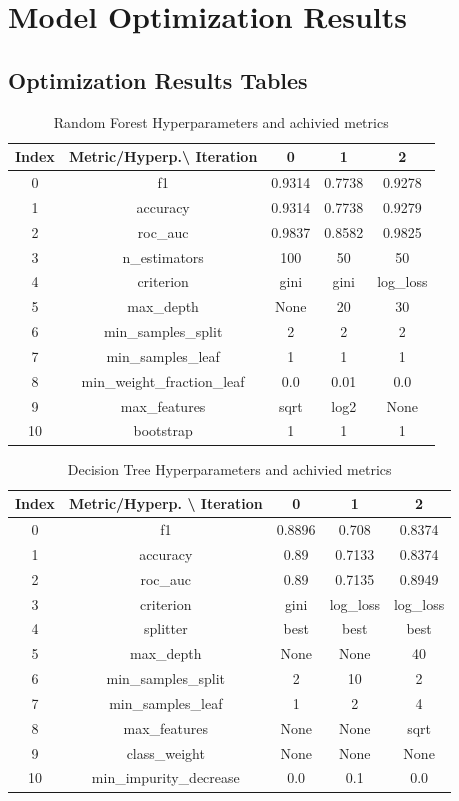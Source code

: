 \documentclass{article}%
\begin{document}
%
\newpage%
\section{Model Optimization Results}%
\label{sec:ModelOptimizationResults}%
\subsection{Optimization Results Tables}%
\label{subsec:OptimizationResultsTables}%


\begin{table}[h!]%
\caption{Random Forest Hyperparameters and achivied metrics}%
\vspace{0.2cm}%
\centering%
\begin{tabular}{|c||c||c||c||c|}%
\hline%
Index&Metric/Hyperp.\textbackslash{} Iteration&0&1&2\\%
\hline%
0&f1&0.9314&0.7738&0.9278\\%
1&accuracy&0.9314&0.7738&0.9279\\%
2&roc\_auc&0.9837&0.8582&0.9825\\%
3&n\_estimators&100&50&50\\%
4&criterion&gini&gini&log\_loss\\%
5&max\_depth&None&20&30\\%
6&min\_samples\_split&2&2&2\\%
7&min\_samples\_leaf&1&1&1\\%
8&min\_weight\_fraction\_leaf&0.0&0.01&0.0\\%
9&max\_features&sqrt&log2&None\\%
10&bootstrap&1&1&1\\%
\hline%
\end{tabular}%
\end{table}

%


\begin{table}[h!]%
\caption{Decision Tree Hyperparameters and achivied metrics}%
\vspace{0.2cm}%
\centering%
\begin{tabular}{|c||c||c||c||c|}%
\hline%
Index&Metric/Hyperp. \textbackslash{} Iteration&0&1&2\\%
\hline%
0&f1&0.8896&0.708&0.8374\\%
1&accuracy&0.89&0.7133&0.8374\\%
2&roc\_auc&0.89&0.7135&0.8949\\%
3&criterion&gini&log\_loss&log\_loss\\%
4&splitter&best&best&best\\%
5&max\_depth&None&None&40\\%
6&min\_samples\_split&2&10&2\\%
7&min\_samples\_leaf&1&2&4\\%
8&max\_features&None&None&sqrt\\%
9&class\_weight&None&None&None\\%
10&min\_impurity\_decrease&0.0&0.1&0.0\\%
\hline%
\end{tabular}%
\end{table}
\end{document}
